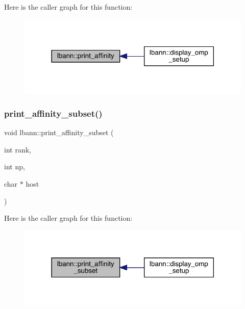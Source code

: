Here is the caller graph for this function\+:\nopagebreak
\begin{figure}[H]
\begin{center}
\leavevmode
\includegraphics[width=318pt]{namespacelbann_a4fd83a86cf27ca7bc1e01576a5ee36e0_icgraph}
\end{center}
\end{figure}
\mbox{\label{namespacelbann_acbd15ead7411cf84db559cc39a82f445}} 
\subsubsection{\texorpdfstring{print\+\_\+affinity\+\_\+subset()}{print\_affinity\_subset()}}
{\footnotesize\ttfamily void lbann\+::print\+\_\+affinity\+\_\+subset (\begin{DoxyParamCaption}\item[{int}]{rank,  }\item[{int}]{np,  }\item[{char $\ast$}]{host }\end{DoxyParamCaption})}

Here is the caller graph for this function\+:\nopagebreak
\begin{figure}[H]
\begin{center}
\leavevmode
\includegraphics[width=318pt]{namespacelbann_acbd15ead7411cf84db559cc39a82f445_icgraph}
\end{center}
\end{figure}
\mbox{\label{namespacelbann_a85385e2a9e058b6720300b4cbdd2b1d0}} 
